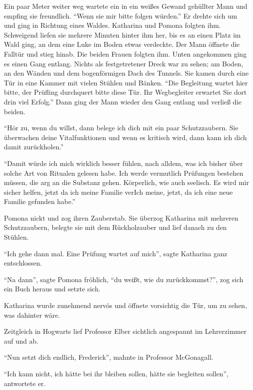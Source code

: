 Ein paar Meter weiter weg wartete ein in ein weißes Gewand gehüllter Mann und empfing sie freundlich. \enquote{Wenn sie mir bitte folgen würden.} Er drehte sich um und ging in Richtung eines Waldes. Katharina und Pomona folgten ihm. Schweigend liefen sie mehrere Minuten hinter ihm her, bis es an einen Platz im Wald ging, an dem eine Luke im Boden etwas verdeckte. Der Mann öffnete die Falltür und stieg hinab. Die beiden Frauen folgten ihm. Unten angekommen ging es einen Gang entlang. Nichts als festgetretener Dreck war zu sehen; am Boden, an den Wänden und dem bogenförmigen Dach des Tunnels. Sie kamen durch eine Tür in eine Kammer mit vielen Stühlen und Bänken. \enquote{Die Begleitung wartet hier bitte, der Prüfling durchquert bitte diese Tür. Ihr Wegbegleiter erwartet Sie dort drin \gst viel Erfolg.} Dann ging der Mann wieder den Gang entlang und verließ die beiden.

\enquote{Hör zu, wenn du willst, dann belege ich dich mit ein paar Schutzzaubern. Sie überwachen deine Vitalfunktionen und wenn es kritisch wird, dann kann ich dich damit zurückholen.}

\enquote{Damit würde ich mich wirklich besser fühlen, nach alldem, was ich bisher über solche Art von Ritualen gelesen habe. Ich werde vermutlich Prüfungen bestehen müssen, die arg an die Substanz gehen. Körperlich, wie auch seelisch. Es wird mir sicher helfen, jetzt da ich meine Familie ver\aabs Ich meine, jetzt, da ich eine neue Familie gefunden habe.}

Pomona nickt und zog ihren Zauberstab. Sie überzog Katharina mit mehreren Schutzzaubern, belegte sie mit dem Rückholzauber und lief danach zu den Stühlen.

\enquote{Ich gehe dann mal. Eine Prüfung wartet auf mich}, sagte Katharina ganz entschlossen.

\enquote{Na dann}, sagte Pomona fröhlich, \enquote{du weißt, wie du zurückkommst?}, zog sich ein Buch heraus und setzte sich.

Katharina wurde zunehmend nervös und öffnete vorsichtig die Tür, um zu sehen, was dahinter wäre.

\trenn

Zeitgleich in Hogwarts lief Professor Elber sichtlich angespannt im Lehrerzimmer auf und ab.

\enquote{Nun setzt dich endlich, Frederick}, mahnte in Professor McGonagall.

\enquote{Ich kann nicht, ich hätte bei ihr bleiben sollen, hätte sie begleiten sollen}, antwortete er.

